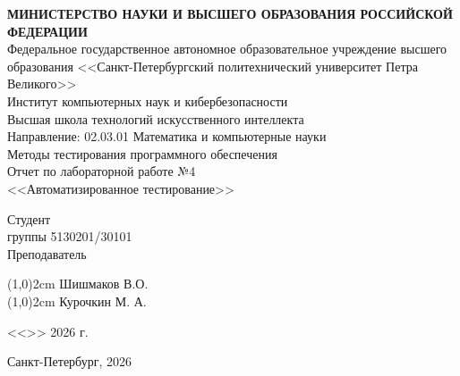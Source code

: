 \documentclass{article}[14pt]
\begin{document}
	
\thispagestyle{empty}
\begin{center}
	\Large {\bfseries МИНИСТЕРСТВО НАУКИ И ВЫСШЕГО ОБРАЗОВАНИЯ РОССИЙСКОЙ ФЕДЕРАЦИИ}
	\\
	\vspace{3mm}
	Федеральное государственное автономное образовательное учреждение высшего образования <<Санкт-Петербургский политехнический университет Петра Великого>>
	\\
	\vspace{3mm}
	Институт компьютерных наук и кибербезопасности
	\\
	\vspace{3mm}
	Высшая школа технологий искусственного интеллекта
	\\
	\vspace{3mm}
	Направление: 02.03.01 Математика и компьютерные науки
	\\
	\vspace{2cm}
	\large{
		Методы тестирования программного обеспечения}
	\\
	\LARGE{
		Отчет по лабораторной работе №4\\
		<<Автоматизированное тестирование>>}
\end{center}

\vspace{5.5cm}
\begin{flushleft}
	\Large
	Студент
	\\
	группы 5130201/30101
	\\
	\vspace{2cm}
	\Large
	Преподаватель
	\\ 
\end{flushleft}
\vspace{-4.6cm}
\begin{flushright}
	\Large
	\line(1,0){2cm}
	\hspace{0.4cm}
	Шишмаков В.О.
	\\
	\vspace{2,7cm}
	\hspace{2cm}
	\Large
	\line(1,0){2cm}
	\hspace{0.4cm}
	Курочкин М. А.
	\hspace{-0.1cm}
	
\end{flushright}

\vspace{1cm}
\hspace{9.8cm}
{
	\Large
	\vspace{0.8cm}
	<<\underline{\hspace{1cm}}>>\underline{\hspace{2.5cm}} 2026 г.
}
\hfill \break
\hfill \break
\hfill \break
\hfill \break
\begin{center} \large{Санкт-Петербург, 2026} \end{center}
\pagebreak
\end{document}
